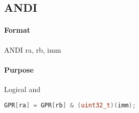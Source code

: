 \subsection{ANDI}


\paragraph{Format} ANDI ra, rb, imm

\paragraph{Purpose} Logical and
\begin{lstlisting}[language=c]
    GPR[ra] = GPR[rb] & (uint32_t)(imm);
\end{lstlisting}
